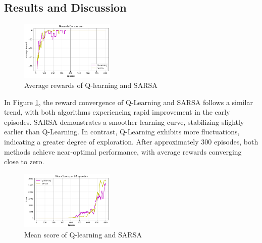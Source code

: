 \documentclass[conference]{IEEEtran}
\begin{document}

\subsection{Results and Discussion}
\begin{figure}[htbp]
\centerline{\includegraphics[width=0.4\textwidth]{rewards.png}}
\caption{Average rewards of Q-learning and SARSA}
\label{fig-reward}
\end{figure}

In Figure \ref{fig-reward}, the reward convergence of Q-Learning and SARSA follows a similar trend, with both algorithms experiencing rapid improvement in the early episodes. SARSA demonstrates a smoother learning curve, stabilizing slightly earlier than Q-Learning. In contrast, Q-Learning exhibits more fluctuations, indicating a greater degree of exploration. After approximately 300 episodes, both methods achieve near-optimal performance, with average rewards converging close to zero.

\begin{figure}[htbp]
\centerline{\includegraphics[width=0.4\textwidth]{scores.png}}
\caption{Mean score of Q-learning and SARSA}
\label{fig-score}
\end{figure}
\end{document}
